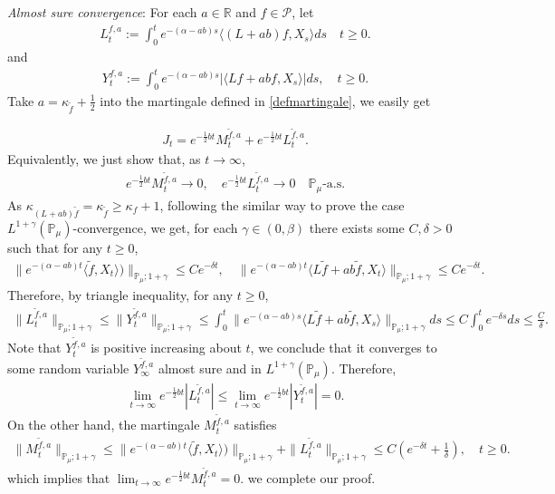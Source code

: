 \documentclass[12pt,oneside,english]{amsart}
\theoremstyle{plain}
\theoremstyle{definition}
\numberwithin{equation}{section}
\begin{document}
{\em Almost sure convergence}: For each $a\in \mathbb{R}$ and $f\in \mathcal{P}$, let
\begin{align}
L_t^{f,a}:=\int_0^t e^{-(\alpha-ab)s}\langle (L+ab)f,X_s\rangle ds \quad t\geq 0.
\end{align}
and 
\begin{align}
    Y_t^{f,a}:=\int_0^t e^{-(\alpha-ab)s}|\langle Lf+abf,X_s\rangle|ds, \quad t\geq0.
\end{align}
 Take $a=\kappa_{\tilde{f}}+\frac{1}{2}$ into the martingale defined in \eqref{defmartingale}, we easily get

\begin{align*}
    J_t=e^{-\frac{1}{2}bt} M_t^{\tilde{f},a}+e^{-\frac{1}{2}bt}L_t^{\tilde{f},a}.
\end{align*}
Equivalently, we just show that, as $t\rightarrow \infty$,
\begin{align*}
    e^{-\frac{1}{2}bt}M_t^{\tilde{f},a}\rightarrow 0, \quad e^{-\frac{1}{2}bt}L_t^{\tilde{f},a}\rightarrow 0 \quad \mathbb{P}_{\mu}\text{-a.s.}
\end{align*}
As $\kappa_{(L+ab)\tilde{f}}=\kappa_{\tilde{f}}\geq \kappa_f+1$, following the similar way to prove the case $L^{1+\gamma}(\mathbb{P}_{\mu})$-convergence, we get, for each $\gamma\in (0,\beta)$ there exists some $C, \delta>0$ such that for any $t\geq 0$,
\begin{align}
    \|e^{-(\alpha-ab)t}\langle \tilde{f},X_t\rangle)\|_{\mathbb{P}_{\mu};1+\gamma}\leq C e^{-\delta t},\quad \|e^{-(\alpha-ab)t}\langle L\tilde{f}+ab\tilde{f},X_t\rangle\|_{\mathbb{P}_{\mu};1+\gamma}\leq C e^{-\delta t}.
\end{align}
Therefore, by triangle inequality, for any $t\geq 0$,
\begin{align*}
    \|L_t^{\tilde{f},a}\|_{\mathbb{P}_{\mu};1+\gamma}\leq\|Y_t^{\tilde{f},a}\|_{\mathbb{P}_{\mu};1+\gamma}\leq \int_0^t \|e^{-(\alpha-ab)s}\langle L\tilde{f}+ab\tilde{f},X_s\rangle\|_{\mathbb{P}_{\mu};1+\gamma}ds\leq C \int_0^t e^{-\delta s}ds\leq\frac{C}{\delta}.
\end{align*}
Note that $Y_t^{\tilde{f},a}$ is positive increasing about $t$, we conclude that it converges to some random variable $Y_{\infty}^{\tilde{f},a}$ almost sure and in $L^{1+\gamma}(\mathbb{P}_{\mu})$. 
Therefore,
\begin{align*}
    \lim_{t\rightarrow \infty}e^{-\frac{1}{2}bt}|L_t^{\tilde{f},a}|\leq  \lim_{t\rightarrow \infty}e^{-\frac{1}{2}bt}|Y_t^{\tilde{f},a}|=0.
\end{align*}
On the other hand, the martingale $M_t^{\tilde{f},a}$ satisfies
\begin{align*}
    \|M_t^{\tilde{f},a}\|_{\mathbb{P}_{\mu};1+\gamma}\leq  \|e^{-(\alpha-ab)t}\langle \tilde{f},X_t\rangle)\|_{\mathbb{P}_{\mu};1+\gamma}+\|L_t^{\tilde{f},a}\|_{\mathbb{P}_{\mu};1+\gamma}\leq C(e^{-\delta t}+\frac{1}{\delta}),\quad t\geq 0.
\end{align*}
which implies that $\lim_{t\rightarrow\infty} e^{-\frac{1}{2}bt}M_t^{\tilde{f},a}=0$. we complete our proof.
\end{document}
